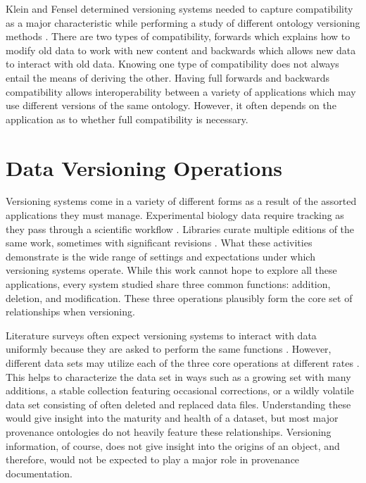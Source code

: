Klein and Fensel determined versioning systems needed to capture compatibility as a major characteristic while performing a study of different ontology versioning methods \cite{Klein01ontologyversioning}.
There are two types of compatibility, forwards which explains how to modify old data to work with new content and backwards which allows new data to interact with old data.
Knowing one type of compatibility does not always entail the means of deriving the other.
Having full forwards and backwards compatibility allows interoperability between a variety of applications which may use different versions of the same ontology.
However, it often depends on the application as to whether full compatibility is necessary.

\section{Data Versioning Operations}

Versioning systems come in a variety of different forms as a result of the assorted applications they must manage.
Experimental biology data require tracking as they pass through a scientific workflow \cite{Tagger2005}.
Libraries curate multiple editions of the same work, sometimes with significant revisions \cite{Wiil:2000:RDH:338407.338517}.
What these activities demonstrate is the wide range of settings and expectations under which versioning systems operate.
While this work cannot hope to explore all these applications, every system studied share three common functions: addition, deletion, and modification.
These three operations plausibly form the core set of relationships when versioning.

Literature surveys often expect versioning systems to interact with data uniformly because they are asked to perform the same functions \cite{Tagger2005}.
However, different data sets may utilize each of the three core operations at different rates \cite{rohtua}.
This helps to characterize the data set in ways such as a growing set with many additions, a stable collection featuring occasional corrections, or a wildly volatile data set consisting of often deleted and replaced data files.
Understanding these would give insight into the maturity and health of a dataset, but most major provenance ontologies do not heavily feature these relationships.
Versioning information, of course, does not give insight into the origins of an object, and therefore, would not be expected to play a major role in provenance documentation.

